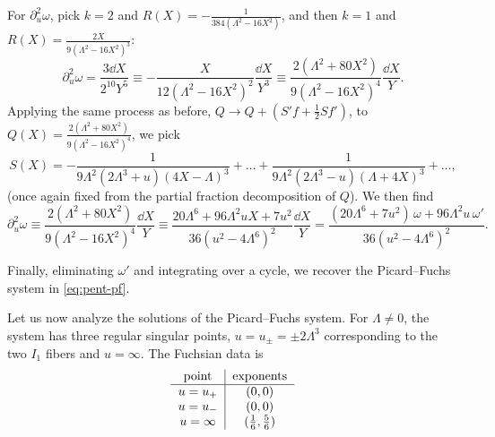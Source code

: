 \documentclass[11pt, a4paper]{article}
\numberwithin{equation}{section}
\begin{document}
For $\partial_u^2 \omega$, pick $k = 2$ and $R(X) = -\frac{1}{384 \left(\Lambda^2-16 X^2\right)}$, and then $k = 1$ and $R(X) = \frac{2 X}{9 \left(\Lambda^2-16 X^2\right)^3}$:
\begin{equation}
  \partial_u^2 \omega = \frac{3 \dd{X}}{2^{10} Y^5} \equiv -\frac{X}{12 \left(\Lambda^2-16 X^2\right)^2} \frac{\dd{X}}{Y^3}
  \equiv \frac{2 \left(\Lambda^2+80 X^2\right)}{9 \left(\Lambda^2-16 X^2\right)^4} \frac{\dd{X}}{Y}.
\end{equation}
Applying the same process as before, $Q \to Q + (S' f + \frac{1}{2} S f')$, to
$Q(X) = \frac{2 \left(\Lambda^2+80 X^2\right)}{9 \left(\Lambda^2-16 X^2\right)^4}$, we pick
\begin{equation}
  S(X) = -\frac{1}{9 \Lambda^2 \left(2 \Lambda^3+u\right) (4 X-\Lambda)^3} + \ldots + \frac{1}{9 \Lambda^2 \left(2 \Lambda^3-u\right) (\Lambda+4 X)^3} + \ldots,
\end{equation}
(once again fixed from the partial fraction decomposition of $Q$). We then find
\begin{equation}
  \partial_u^2 \omega \equiv \frac{2 \left(\Lambda^2+80 X^2\right)}{9 \left(\Lambda^2-16 X^2\right)^4} \frac{\dd{X}}{Y}
  \equiv \frac{20 \Lambda^6+96 \Lambda^2 u X+7 u^2}{36 \left(u^2-4 \Lambda^6\right)^2} \frac{\dd{X}}{Y}
  = \frac{(20 \Lambda^6+7 u^2)\, \omega + 96 \Lambda^2 u \, \omega'}{36 \left(u^2-4 \Lambda^6\right)^2}.
\end{equation}

Finally, eliminating $\omega'$ and integrating over a cycle, we recover the Picard--Fuchs system in \cref{eq:pent-pf}.

Let us now analyze the solutions of the Picard--Fuchs system. For $\Lambda \neq 0$, the system has three regular singular points, $u = u_{\pm} = \pm 2 \Lambda^3$ corresponding to the two $I_1$ fibers and $u = \infty$. The Fuchsian data is
\begin{equation}
\begin{tabular}{c|c}
point & exponents \\
\hline
$u=u_+$      & $(0, 0)$ \\
$u=u_-$      & $(0, 0)$ \\
$u=\infty$ & $(\tfrac16, \tfrac56)$ \\
\end{tabular}
\end{equation}
\end{document}
